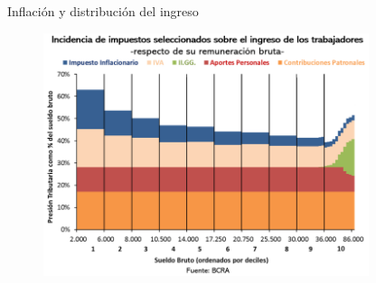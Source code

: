 \documentclass{beamer}
\begin{document}
\begin{frame}{Inflación y distribución del ingreso}
    \begin{figure}[H]   
        \centering
        \includegraphics[width=0.85\textwidth]{../Figures/C38.17.png}\
    \end{figure}
\end{frame}
\end{document}
